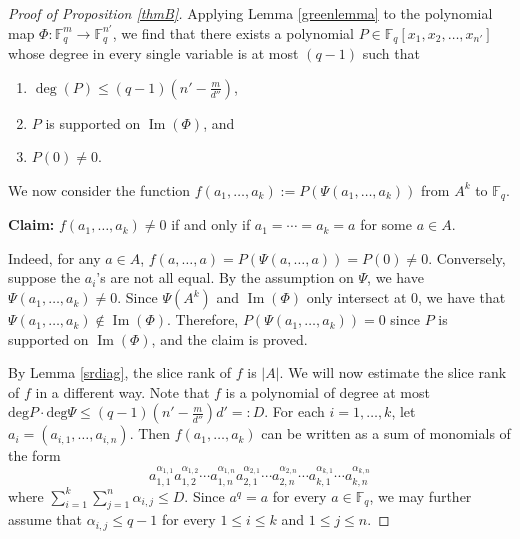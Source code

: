 \documentclass[11pt]{amsart}
\DeclareMathOperator{\Ima}{Im}
\newcommand{\F}{\mathbb{F}}
\newcommand\Fq{{\mathbb{F}_q}}
\theoremstyle{definition}
\theoremstyle{remark}
\begin{document}
\begin{proof}[Proof of Proposition \ref{thmB}]
	
Applying Lemma \ref{greenlemma} to the polynomial map $\Phi: \mathbb{F}_q^m \rightarrow \mathbb{F}_q^{n'}$, we find that there exists a polynomial $P\in \Fq[x_1,x_2,\dots,x_{n'}]$ whose degree in every single variable is at most $(q-1)$ such that 
	\begin{enumerate}[label=(\roman*)]
		\item  $\deg(P) \leq (q-1) \left(n'-\frac{m}{d''}\right)$,
		\item $P$ is supported on $\Ima(\Phi)$, and
		\item $P(0)\neq 0$.
	\end{enumerate}
We now consider the function	$f(a_1, \ldots , a_k) := P(\Psi(a_1, \ldots, a_k))$ from $A^k$ to $\Fq$.
	
\noindent	\textbf{Claim:} $f(a_1, \ldots , a_k) \neq 0 $ if and only if $a_1= \cdots = a_k = a$ for some $a \in A$.

Indeed, for any $a \in A $, $f(a, \ldots , a)= P(\Psi(a, \ldots, a)) = P(0) \neq 0$. Conversely, suppose the $a_i$'s are not all equal. By the assumption on $\Psi$, we have $\Psi(a_1, \ldots, a_k) \neq 0$. Since $\Psi(A^k)$ and $\Ima(\Phi)$ only intersect at $0$, we have that $\Psi(a_1, \ldots, a_k) \notin \Ima(\Phi)$. Therefore, $P(\Psi(a_1, \ldots, a_k)) = 0$ since $P$ is supported on $\Ima(\Phi)$, and the claim is proved.
	
By Lemma \ref{srdiag}, the slice rank of $f$ is $|A|$. We will now estimate the slice rank of $f$ in a different way. Note that $f$ is a polynomial of degree at most $\text{deg}P\cdot\text{deg}\Psi \leq (q-1)\left(n'-\frac{m}{d''}\right)d'=: D$. For each $i=1, \ldots, k$, let $a_i = (a_{i,1}, \ldots, a_{i,n})$. Then $f(a_1, \ldots, a_k)$ can be written as a sum of monomials of the form
	\begin{equation} \label{eq:slice}
		a_{1,1}^{\alpha_{1,1}}a_{1,2}^{\alpha_{1,2}}\cdots a_{1,n}^{\alpha_{1,n}}a_{2,1}^{\alpha_{2,1}} \cdots a_{2,n}^{\alpha_{2,n}}\cdots a_{k,1}^{\alpha_{k,1}} \cdots a_{k,n}^{\alpha_{k,n}}
	\end{equation}
	where $\sum_{i=1}^{k}\sum_{j=1}^{n}\alpha_{i,j}\leq  D$. Since $a^q=a$ for every $a \in \F_q$, we may further assume that $\alpha_{i,j}\leq q-1$ for every $1 \leq i \leq k$ and $1 \leq j \leq n$.
	

\end{proof}
\end{document}

